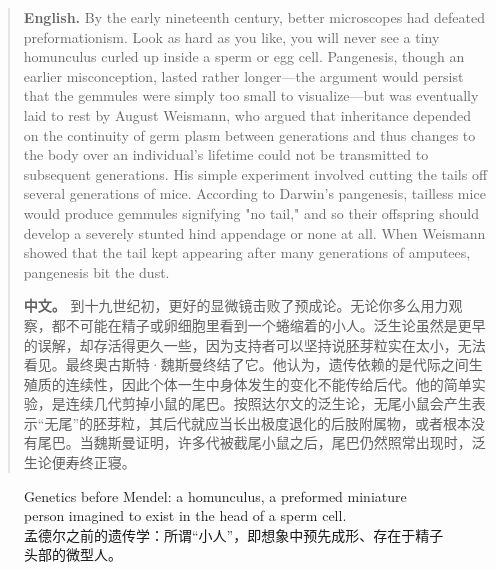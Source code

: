 \begin{quote}
\noindent\textbf{English.} By the early nineteenth century, better microscopes had defeated preformationism. Look as hard as you like, you will never see a tiny homunculus curled up inside a sperm or egg cell. Pangenesis, though an earlier misconception, lasted rather longer---the argument would persist that the gemmules were simply too small to visualize---but was eventually laid to rest by August Weismann, who argued that inheritance depended on the continuity of germ plasm between generations and thus changes to the body over an individual's lifetime could not be transmitted to subsequent generations. His simple experiment involved cutting the tails off several generations of mice. According to Darwin's pangenesis, tailless mice would produce gemmules signifying "no tail," and so their offspring should develop a severely stunted hind appendage or none at all. When Weismann showed that the tail kept appearing after many generations of amputees, pangenesis bit the dust.

\smallskip
\noindent\textbf{中文。} 到十九世纪初，更好的显微镜击败了预成论。无论你多么用力观察，都不可能在精子或卵细胞里看到一个蜷缩着的小人。泛生论虽然是更早的误解，却存活得更久一些，因为支持者可以坚持说胚芽粒实在太小，无法看见。最终奥古斯特·魏斯曼终结了它。他认为，遗传依赖的是代际之间生殖质的连续性，因此个体一生中身体发生的变化不能传给后代。他的简单实验，是连续几代剪掉小鼠的尾巴。按照达尔文的泛生论，无尾小鼠会产生表示“无尾”的胚芽粒，其后代就应当长出极度退化的后肢附属物，或者根本没有尾巴。当魏斯曼证明，许多代被截尾小鼠之后，尾巴仍然照常出现时，泛生论便寿终正寝。
\end{quote}

\begin{figure}[htbp]
\centering
{}
\caption{Genetics before Mendel: a homunculus, a preformed miniature person imagined to exist in the head of a sperm cell.\\孟德尔之前的遗传学：所谓“小人”，即想象中预先成形、存在于精子头部的微型人。}
\end{figure}

